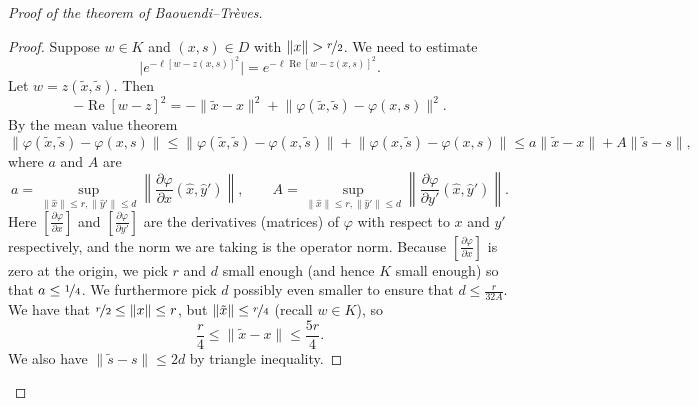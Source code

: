 \documentclass[12pt,openany]{book}
\renewcommand{\Re}{\operatorname{Re}}
\newcommand{\snorm}[1]{\lVert {#1} \rVert}
\newcommand{\babs}[1]{\bigl\lvert {#1} \bigr\rvert}
\newcommand{\norm}[1]{\left\lVert {#1} \right\rVert}
\theoremstyle{plain}
\theoremstyle{remark}
\theoremstyle{definition}
\theoremstyle{exercise}
\theoremstyle{example}
\begin{document}
\begin{proof}[Proof of the theorem of Baouendi--Tr{\`e}ves]
\begin{proof}
Suppose $w \in K$ and $(x,s) \in D$ with $\snorm{x} > \nicefrac{r}{2}$.  We need to estimate
\begin{equation*}
\babs{e^{ -\ell {[w - z(x,s)]}^2 }} =
e^{ -\ell \Re {[w - z(x,s)]}^2 } .
\end{equation*}
Let $w = z(\tilde{x},\tilde{s})$.  Then
\begin{equation*}
-\Re {[w - z]}^2 =
-\snorm{\tilde{x}-x}^2
+
\snorm{\varphi(\tilde{x},\tilde{s})-\varphi(x,s)}^2 .
\end{equation*}
By the mean value theorem
\begin{equation*}
\snorm{\varphi(\tilde{x},\tilde{s})-\varphi(x,s)}
\leq
\snorm{\varphi(\tilde{x},\tilde{s})-\varphi(x,\tilde{s})}
+
\snorm{\varphi(x,\tilde{s})-\varphi(x,s)}
\leq
a \snorm{\tilde{x}-x}
+
A \snorm{\tilde{s}-s} ,
\end{equation*}
where $a$ and $A$ are 
\begin{equation*}
a = \sup_{\snorm{\hat{x}} \leq r, \snorm{\hat{y}'} \leq d}
\norm{\frac{\partial \varphi}{\partial x}(\hat{x},\hat{y}')},
\qquad
A = \sup_{\snorm{\hat{x}} \leq r, \snorm{\hat{y}'} \leq d}
\norm{\frac{\partial \varphi}{\partial y'}(\hat{x},\hat{y}')}.
\end{equation*}
Here $\left[ \frac{\partial \varphi}{\partial x} \right]$ and 
$\left[ \frac{\partial \varphi}{\partial y'} \right]$ are
the derivatives (matrices) of $\varphi$ with respect to $x$ and $y'$
respectively, and the norm we are taking is the operator norm.
Because $\left[ \frac{\partial \varphi}{\partial x} \right]$ is zero
at the origin, we pick $r$ and $d$ small
enough (and hence $K$ small enough) so that $a \leq \nicefrac{1}{4}$.
We furthermore pick $d$ possibly even smaller to ensure
that $d \leq \frac{r}{32A}$.  We have that $\nicefrac{r}{2} \leq \snorm{x} \leq
r$, but $\snorm{\tilde{x}} \leq \nicefrac{r}{4}$ (recall $w \in K$), so
\begin{equation*}
\frac{r}{4} \leq \snorm{\tilde{x}-x} \leq \frac{5r}{4} .
\end{equation*}
We also have $\snorm{\tilde{s}-s} \leq 2d$ by triangle inequality.


\end{proof}
\end{proof}
\end{document}

